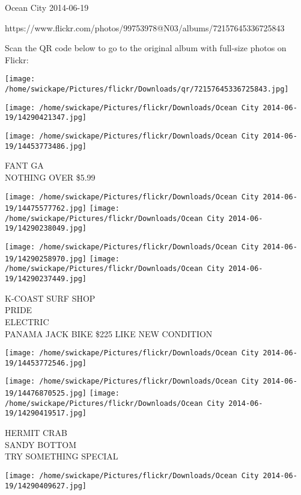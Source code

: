 \documentclass[10pt,letterpaper]{article}
\begin{document}
Ocean City 2014-06-19

https://www.flickr.com/photos/99753978@N03/albums/72157645336725843

Scan the QR code below to go to the original album with full-size photos on Flickr:

\texttt{[image: /home/swickape/Pictures/flickr/Downloads/qr/72157645336725843.jpg]}
\pagebreak

\texttt{[image: /home/swickape/Pictures/flickr/Downloads/Ocean City 2014-06-19/14290421347.jpg]}

\vspace{0.25in}
\texttt{[image: /home/swickape/Pictures/flickr/Downloads/Ocean City 2014-06-19/14453773486.jpg]}

FANT GA\\
NOTHING OVER \$5.99\\
\pagebreak

\texttt{[image: /home/swickape/Pictures/flickr/Downloads/Ocean City 2014-06-19/14475577762.jpg]}
\texttt{[image: /home/swickape/Pictures/flickr/Downloads/Ocean City 2014-06-19/14290238049.jpg]}

\texttt{[image: /home/swickape/Pictures/flickr/Downloads/Ocean City 2014-06-19/14290258970.jpg]}
\texttt{[image: /home/swickape/Pictures/flickr/Downloads/Ocean City 2014-06-19/14290237449.jpg]}

K{-}COAST SURF SHOP\\
PRIDE\\
ELECTRIC\\
PANAMA JACK BIKE \$225 LIKE NEW CONDITION\\
\pagebreak

\texttt{[image: /home/swickape/Pictures/flickr/Downloads/Ocean City 2014-06-19/14453772546.jpg]}

\vspace{0.25in}
\texttt{[image: /home/swickape/Pictures/flickr/Downloads/Ocean City 2014-06-19/14476870525.jpg]}
\texttt{[image: /home/swickape/Pictures/flickr/Downloads/Ocean City 2014-06-19/14290419517.jpg]}

HERMIT CRAB\\
SANDY BOTTOM\\
TRY SOMETHING SPECIAL\\
\pagebreak

\texttt{[image: /home/swickape/Pictures/flickr/Downloads/Ocean City 2014-06-19/14290409627.jpg]}
\end{document}
